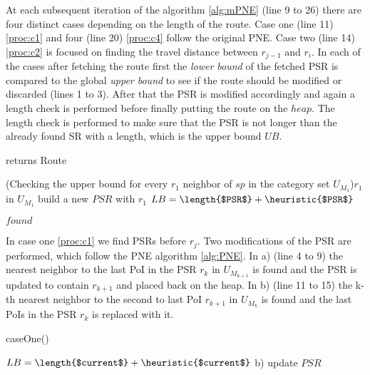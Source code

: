 At each subsequent iteration of the algorithm \ref{alg:mPNE} (line 9 to 26) there are four distinct cases depending on the length of the route. Case one (line 11) \ref{proc:c1} and four (line 20) \ref{proc:c4} follow the original PNE. Case two (line 14) \ref{proc:c2} is focused on finding the travel distance between $r_{j-1}$ and $r_i$. In each of the cases after fetching the route first the \textit{lower bound} of the fetched PSR is compared to the global \textit{upper bound} to see if the route should be modified or discarded (lines 1 to 3). After that the PSR is modified accordingly and again a length check is performed before finally putting the route on the $heap$. The length check is performed to make sure that the PSR is not longer than the already found SR with a length, which is the upper bound $UB$.  

\begin{algorithm}[H]
	\label{alg:mPNE}
	\caption{\protect\modifiedPNE returns Route}
	
	\ForEach(Checking the upper bound for every $r_1$ neighbor of $sp$ in the category set $U_{M_1}$){$r_1$ in $U_{M_1}$}{
		build a new $PSR$ with $r_1$\;
		$LB = \length{$PSR$} + \heuristic{$PSR$}$\;
	}
	
	
	\Return $found$
	
\end{algorithm}

In case one \ref{proc:c1} we find PSRs before $r_j$. Two modifications of the PSR are performed, which follow the PNE algorithm \ref{alg:PNE}. In a) (line 4 to 9) the nearest neighbor to the last PoI in the PSR $r_k$ in $U_{M_{k+1}}$ is found and the PSR is updated to contain $r_{k+1}$ and placed back on the heap. In b) (line 11 to 15) the k-th nearest neighbor to the second to last PoI $r_{k+1}$ in $U_{M_{k}}$ is found and the last PoIs in the PSR $r_k$ is replaced with it.

\pagebreak

\begin{procedure}[H]
	\label{proc:c1}
	\caption{caseOne()}
	
	$LB = \length{$current$} + \heuristic{$current$}$\;
	b) \;
	update $PSR$\;
\end{procedure}

